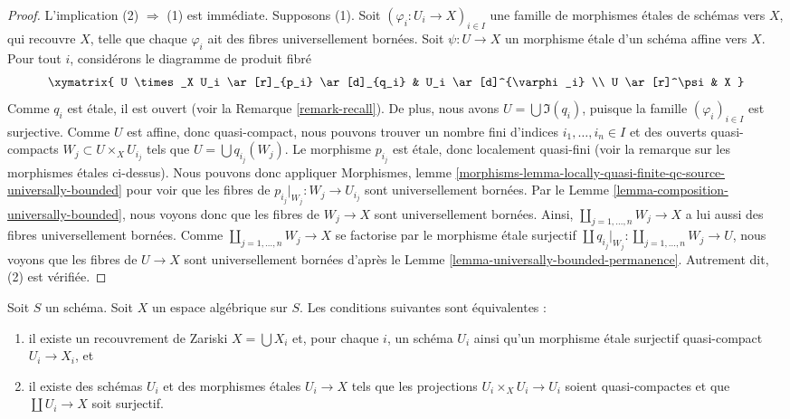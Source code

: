 \begin{proof}
L'implication (2) $\Rightarrow$ (1) est immédiate.
Supposons (1). Soit $(\varphi_i : U_i \to X)_{i \in I}$ une famille de
morphismes étales de schémas vers $X$, qui recouvre $X$, telle que
chaque $\varphi_i$ ait des fibres universellement bornées.
Soit $\psi : U \to X$ un morphisme étale d'un schéma affine vers $X$.
Pour tout $i$, considérons le diagramme de produit fibré
$$
\xymatrix{
U \times_X U_i \ar[r]_{p_i} \ar[d]_{q_i} & U_i \ar[d]^{\varphi_i} \\
U \ar[r]^\psi & X
}
$$
Comme $q_i$ est étale, il est ouvert (voir la Remarque \ref{remark-recall}).
De plus, nous avons $U = \bigcup \Im(q_i)$, puisque la famille
$(\varphi_i)_{i \in I}$ est surjective. Comme $U$ est affine, donc
quasi-compact, nous pouvons trouver un nombre fini d'indices
$i_1, \ldots, i_n \in I$ et des ouverts quasi-compacts
$W_j \subset U \times_X U_{i_j}$ tels que
$U = \bigcup q_{i_j}(W_j)$.
Le morphisme $p_{i_j}$ est étale, donc localement quasi-fini
(voir la remarque sur les morphismes étales ci-dessus). Nous pouvons donc
appliquer Morphismes, lemme
\ref{morphisms-lemma-locally-quasi-finite-qc-source-universally-bounded}
pour voir que les fibres de $p_{i_j}|_{W_j} : W_j \to U_{i_j}$ sont
universellement bornées. Par le
Lemme \ref{lemma-composition-universally-bounded},
nous voyons donc que les fibres de $W_j \to X$ sont universellement bornées.
Ainsi, $\coprod_{j = 1, \ldots, n} W_j \to X$ a lui aussi des fibres
universellement bornées. Comme $\coprod_{j = 1, \ldots, n} W_j \to X$ se
factorise par le morphisme étale surjectif
$\coprod q_{i_j}|_{W_j} : \coprod_{j = 1, \ldots, n} W_j \to U$, nous
voyons que les fibres de $U \to X$ sont universellement bornées d'après le
Lemme \ref{lemma-universally-bounded-permanence}.
Autrement dit, (2) est vérifiée.
\end{proof}

\begin{lemma}
\label{lemma-characterize-very-reasonable}
Soit $S$ un schéma.
Soit $X$ un espace algébrique sur $S$.
Les conditions suivantes sont équivalentes :
\begin{enumerate}
\item il existe un recouvrement de Zariski $X = \bigcup X_i$ et, pour
chaque $i$, un schéma $U_i$ ainsi qu'un morphisme étale surjectif
quasi-compact $U_i \to X_i$, et
\item il existe des schémas $U_i$ et des morphismes étales $U_i \to X$
tels que les projections $U_i \times_X U_i \to U_i$ soient quasi-compactes
et que $\coprod U_i \to X$ soit surjectif.
\end{enumerate}
\end{lemma}


